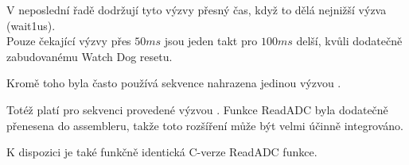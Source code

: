 V neposlední řadě dodržují tyto výzvy přesný čas, když to dělá nejnižší výzva (wait1us).
\\Pouze čekající výzvy přes \(50ms\) jsou jeden takt pro \(100ms\) delší, kvůli dodatečně zabudovanému
Watch Dog resetu.


Kromě toho byla často používá sekvence  nahrazena jedinou výzvou .

Totéž platí pro sekvenci  provedené výzvou
.
Funkce ReadADC byla dodatečně přenesena do assembleru, takže toto rozšíření
může být velmi účinně integrováno.

K dispozici je také funkčně identická C-verze ReadADC funkce.
